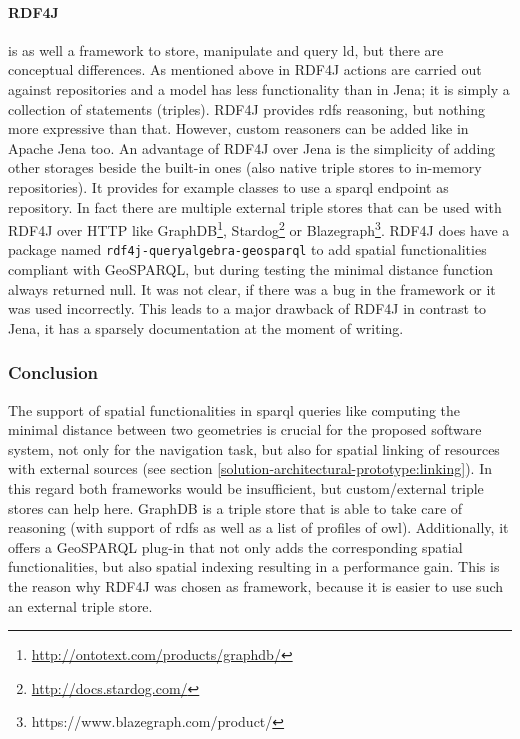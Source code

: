 \documentclass[draft,final]{vutinfth} %
\begin{document}
\paragraph{RDF4J} is as well a framework to store, manipulate and query \gls{ld}, but there are conceptual differences. As mentioned above in RDF4J actions are carried out against repositories and a model has less functionality than in Jena; it is simply a collection of statements (triples). RDF4J provides \gls{rdfs} reasoning, but nothing more expressive than that. However, custom reasoners can be added like in Apache Jena too. An advantage of RDF4J over Jena is the simplicity of adding other storages beside the built-in ones (also native triple stores to in-memory repositories). It provides for example classes to use a \gls{sparql} endpoint as repository. In fact there are multiple external triple stores that can be used with RDF4J over HTTP like GraphDB\footnote{\url{http://ontotext.com/products/graphdb/}}, Stardog\footnote{\url{http://docs.stardog.com/}} or Blazegraph\footnote{https://www.blazegraph.com/product/}. RDF4J does have a package named \texttt{rdf4j-queryalgebra-geosparql} to add spatial functionalities compliant with GeoSPARQL, but during testing the minimal distance function always returned null. It was not clear, if there was a bug in the framework or it was used incorrectly. This leads to a major drawback of RDF4J in contrast to Jena, it has a sparsely documentation at the moment of writing.

\subsubsection{Conclusion}

The support of spatial functionalities in \gls{sparql} queries like computing the minimal distance between two geometries is crucial for the proposed software system, not only for the navigation task, but also for spatial linking of resources with external sources (see section \ref{solution-architectural-prototype:linking}). In this regard both frameworks would be insufficient, but custom/external triple stores can help here. GraphDB is a triple store that is able to take care of reasoning (with support of \gls{rdfs} as well as a list of profiles of \gls{owl}). Additionally, it offers a GeoSPARQL plug-in that not only adds the corresponding spatial functionalities, but also spatial indexing resulting in a performance gain. This is the reason why RDF4J was chosen as framework, because it is easier to use such an external triple store.
\end{document}
